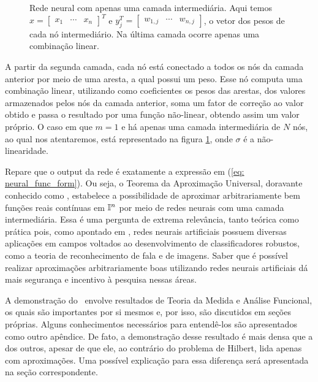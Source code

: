\begin{figure}[h]
    \begin{center}
        
    \end{center}
    \caption{Rede neural com apenas uma camada intermediária.
    Aqui temos \( x =
    \begin{bmatrix}
        x_{ 1 } & \cdots & x_{ n }
    \end{bmatrix}^{ T } \) e \( y_{ j }^{ T } =
    \begin{bmatrix}
        w_{ 1,j } & \cdots & w_{ n,j }
    \end{bmatrix} \), o vetor dos pesos de cada nó intermediário.
    Na última camada ocorre apenas uma combinação linear.}
    \label{fig: neural_net}
\end{figure}

A partir da segunda camada, cada nó está conectado a todos os nós da camada anterior por meio de uma aresta, a qual possui um peso.
Esse nó computa uma combinação linear, utilizando como coeficientes os pesos das arestas, dos valores armazenados pelos nós da camada anterior, soma um fator de correção ao valor obtido e passa o resultado por uma função não-linear, obtendo assim um valor próprio.
O caso em que \( m = 1 \) e há apenas uma camada intermediária de \( N \) nós, ao qual nos atentaremos, está representado na figura \ref{fig: neural_net}, onde \( \sigma \) é a não-linearidade.


Repare que o output da rede é exatamente a expressão em (\ref{eq: neural_func_form}).
Ou seja, o Teorema da Aproximação Universal, doravante conhecido como \uat , estabelece a possibilidade de aproximar arbitrariamente bem funções reais contínuas em \( \mathbb{I}^{ n } \) por meio de redes neurais com uma camada intermediária.
Essa é uma pergunta de extrema relevância, tanto teórica como prática pois, como apontado em \cite{lipmann}, redes neurais artificiais possuem diversas aplicações em campos voltados ao desenvolvimento de classificadores robustos, como a teoria de reconhecimento de fala e de imagens.
Saber que é possível realizar aproximações arbitrariamente boas utilizando redes neurais artificiais dá mais segurança e incentivo à pesquisa nessas áreas.

A demonstração do \uat \ envolve resultados de Teoria da Medida e Análise Funcional, os quais são importantes por si mesmos e, por isso, são discutidos em seções próprias.
Alguns conhecimentos necessários para entendê-los são apresentados como outro apêndice.
De fato, a demonstração desse resultado é mais densa que a dos outros, apesar de que ele, ao contrário do problema de Hilbert, lida apenas com aproximações.
Uma possível explicação para essa diferença será apresentada na seção correspondente.

